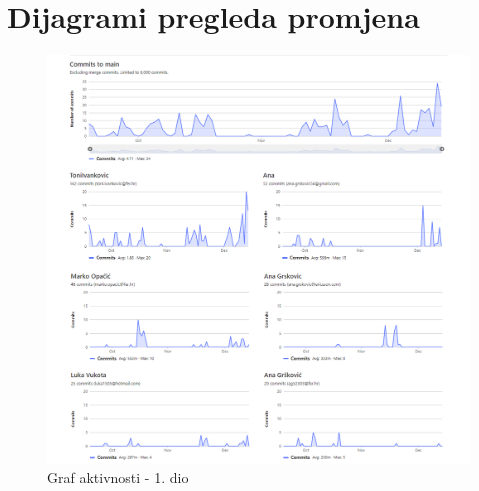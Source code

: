 					
		\eject
		\section*{Dijagrami pregleda promjena}
		
		
\begin{figure}
    \centering
    \includegraphics{slike/Graf aktivnosti.png}
    \caption{Graf aktivnosti - 1. dio}
    \label{fig:grarf_aktivnosti_1}
\end{figure}
